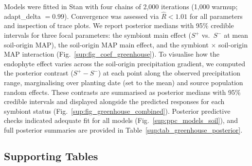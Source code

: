 \documentclass[12pt]{article}\usepackage[]{graphicx}\usepackage[dvipsnames]{xcolor}
\begin{document}
{Models were fitted in Stan \citep{carpenter2017stan} with four chains of 2,000 iterations (1,000 warmup; adapt\_delta $= 0.99$). Convergence was assessed via $\hat{R} < 1.01$ for all parameters and inspection of trace plots.
We report posterior medians with 95\% credible intervals for three focal parameters: the symbiont main effect ($S^{+}$ vs.\ $S^{-}$ at mean soil-origin MAP), the soil-origin MAP main effect, and the symbiont 
$\times$ soil-origin MAP interaction (Fig.~\ref{sup:fig_coef_greenhouse}). 
To visualise how the endophyte effect varies across the soil-origin precipitation gradient, we computed the posterior contrast ($S^{+} - S^{-}$) 
at each point along the observed precipitation range, marginalising over planting date (set to the mean) and source population random effects. 
These contrasts are summarised as posterior medians with 95\% credible intervals and displayed alongside the predicted responses for each symbiont 
status (Fig.~\ref{sup:fig_greenhouse_combined}). 
Posterior predictive checks indicated adequate fit for all models (Fig.~\ref{sup:ppc_models_soil}), and full posterior summaries are provided in Table~\ref{sup:tab_greenhouse_posterior}.



\clearpage

\subsection*{Supporting Tables}
\begin{table}
    \centering
    \small
    
    \caption{Geographic coordinates and descriptions of source populations for study species.
    For each source population, the table shows the total number of plants included in the experiment, the number of unique genotypes, and the average clonal replication per genotype.}
    \label{tab:source_pop}
\end{table}
\clearpage

\begin{table}[ht]
    \centering
    \caption{Summary of symbiont removal treatments by species and population.
    N indicates the number of plants tested for symbiont status and
    \%$S^{+}$ indicates the proportion that tested positive.
    Treatment refers to the symbiont removal treatment applied to the seed lineage: Control (no treatment) or Heat (5 days in a drying oven at 60\degree C for \emph{E. virginicus} and \emph{P. autumnalis};12 minutes in a 60\degree C water bath for \emph{A. hyemalis}).
    For all populations except SFAEF and PALM, heat-treated seed lineages were one or more generations removed from the treatment;for those two populations, plants from heat-treated seeds were used directly in the experiment.}
    \label{tab:heat_treatment}
    
\end{table}
\clearpage

}
\end{document}
